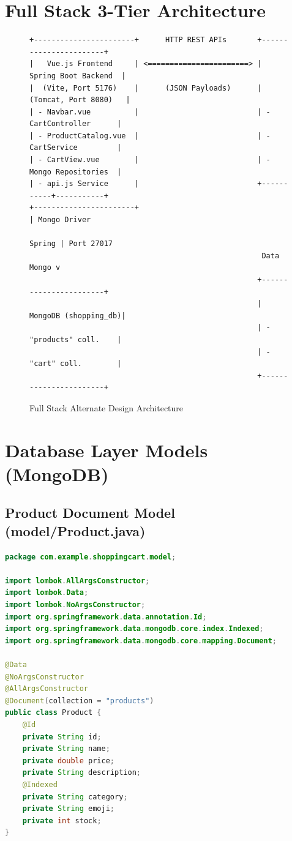 \documentclass[11pt,a4paper]{article}
\begin{document}
\section{Full Stack 3-Tier Architecture}
\begin{figure}[htbp]
\centering
\begin{verbatim}
+-----------------------+      HTTP REST APIs       +-----------------------+
|   Vue.js Frontend     | <=======================> |  Spring Boot Backend  |
|  (Vite, Port 5176)    |      (JSON Payloads)      |  (Tomcat, Port 8080)   |
| - Navbar.vue          |                           | - CartController      |
| - ProductCatalog.vue  |                           | - CartService         |
| - CartView.vue        |                           | - Mongo Repositories  |
| - api.js Service      |                           +-----------+-----------+
+-----------------------+                                       | Mongo Driver
                                                         Spring | Port 27017
                                                     Data Mongo v
                                                    +-----------------------+
                                                    |  MongoDB (shopping_db)|
                                                    | - "products" coll.    |
                                                    | - "cart" coll.        |
                                                    +-----------------------+
\end{verbatim}
\caption{Full Stack Alternate Design Architecture}
\end{figure}

\section{Database Layer Models (MongoDB)}

\subsection{Product Document Model (model/Product.java)}
\begin{lstlisting}[language=java]
package com.example.shoppingcart.model;

import lombok.AllArgsConstructor;
import lombok.Data;
import lombok.NoArgsConstructor;
import org.springframework.data.annotation.Id;
import org.springframework.data.mongodb.core.index.Indexed;
import org.springframework.data.mongodb.core.mapping.Document;

@Data
@NoArgsConstructor
@AllArgsConstructor
@Document(collection = "products")
public class Product {
    @Id
    private String id;
    private String name;
    private double price;
    private String description;
    @Indexed
    private String category;
    private String emoji;
    private int stock;
}
\end{lstlisting}
\end{document}
